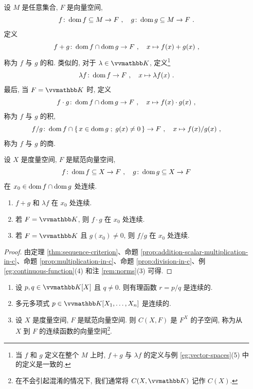 \begin{definition}[函数的运算]
    设 \(M\) 是任意集合, \(F\) 是向量空间,
    \[
        f \colon \operatorname{dom} f \subseteq M \to F\ ,\quad g \colon \operatorname{dom} g \subseteq M \to F\ .
    \]
    定义
    \[
        f + g \colon \operatorname{dom} f \cap \operatorname{dom} g \to F\ ,\quad x \mapsto f(x) + g(x)\ ,
    \]
    称为 \(f\) 与 \(g\) 的和. 类似的, 对于 \(\lambda \in \K\), 定义\footnote{当 \(f\) 和 \(g\) 定义在整个 \(M\) 上时, \(f + g\) 与 \(\lambda f\) 的定义与例 \ref{eg:vector-spaces}(5) 中的定义是一致的.}
    \[
        \lambda f \colon \operatorname{dom} f \to F\ ,\quad x \mapsto \lambda f(x)\ .
    \]
    最后, 当 \(F = \K\) 时, 定义
    \[
        f \cdot g \colon \operatorname{dom} f \cap \operatorname{dom} g \to F\ ,\quad x \mapsto f(x) \cdot g(x)\ ,
    \]
    称为 \(f\) 与 \(g\) 的积,
    \[
        f / g \colon \dom f \cap \{\, x \in \dom g \;;\; g(x) \neq 0 \,\} \to F\ ,\quad x \mapsto f(x) / g(x)\ ,
    \]
    称为 \(f\) 与 \(g\) 的商.
\end{definition}

\begin{proposition}\label{prop:calculating-with-continuous-functions}
    设 \(X\) 是度量空间, \(F\) 是赋范向量空间,
    \[
        f \colon \operatorname{dom} f \subseteq X \to F\ ,\quad g \colon \operatorname{dom} g \subseteq X \to F
    \]
    在 \(x_0 \in \operatorname{dom} f \cap \operatorname{dom} g\) 处连续.
    \begin{enumerate}
        \item \(f + g\) 和 \(\lambda f\) 在 \(x_0\) 处连续.
        \item 若 \(F = \K\), 则 \(f \cdot g\) 在 \(x_0\) 处连续.
        \item 若 \(F = \K\) 且 \(g(x_0) \neq 0\), 则 \(f / g\) 在 \(x_0\) 处连续.
    \end{enumerate}
\end{proposition}

\begin{proof}
    由定理 \ref{thm:sequence-criterion}、命题 \ref{prop:addition-scalar-multiplication-in-c}、命题 \ref{prop:multiplication-in-c}、命题 \ref{prop:division-in-c}、例 \ref{eg:continuous-function}(4) 和注 \ref{rem:norms}(3) 可得.
\end{proof}

\begin{corollary}\label{cor:polynomial-is-continuous}
    \begin{enumerate}
        \item 设 \(p, q \in \K[X]\) 且 \(q \neq 0\). 则有理函数 \(r = p / q\) 是连续的.
        \item 多元多项式 \(p \in \K[X_1, \ldots, X_n]\) 是连续的.
        \item 设 \(X\) 是度量空间, \(F\) 是赋范向量空间. 则 \(C(X, F)\) 是 \(F^X\) 的子空间, 称为从 \(X\) 到 \(F\) 的连续函数的向量空间\footnote{在不会引起混淆的情况下, 我们通常将 \(C(X, \K)\) 记作 \(C(X)\).}.
    \end{enumerate}
\end{corollary}

